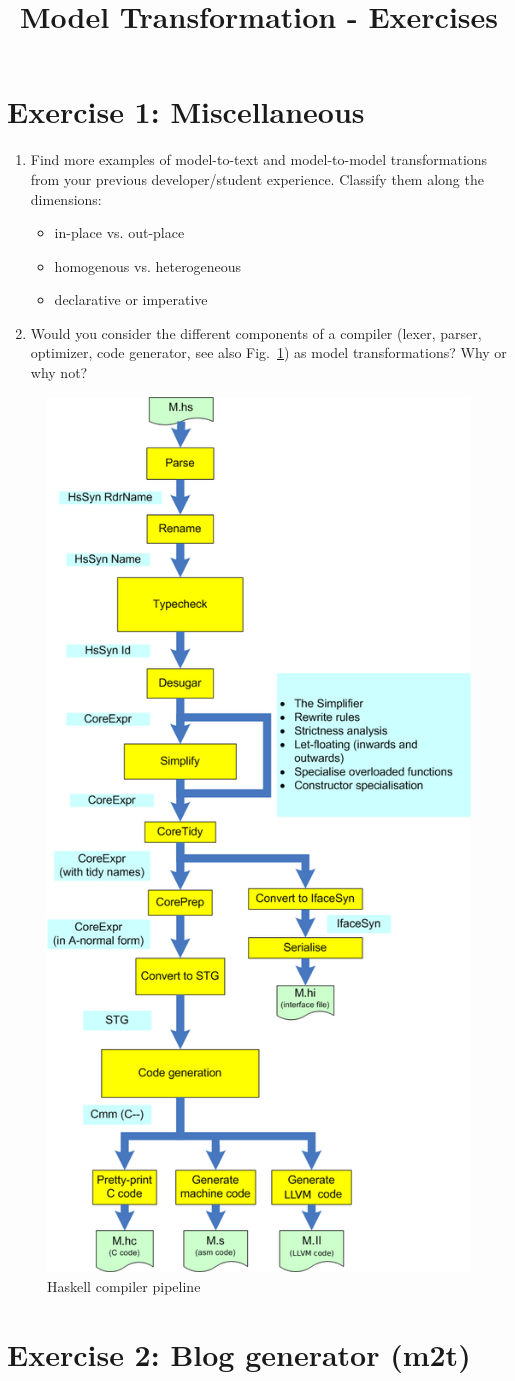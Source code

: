 \documentclass{article}
\title{Model Transformation - Exercises}
\author{}
\date{}
\begin{document}
	
	\maketitle
	
	\section*{Exercise 1: Miscellaneous}
	
	\begin{enumerate}
		\item Find more examples of model-to-text and model-to-model transformations from your previous developer/student experience. 
		Classify them along the dimensions:
		\begin{itemize}
			\item in-place vs. out-place
			\item homogenous vs. heterogeneous
			\item declarative or imperative
		\end{itemize}
		\item Would you consider the different components of a compiler (lexer, parser, optimizer, code generator, see also Fig.~\ref{fig:compilerPipeline}) as model transformations? Why or why not? 
	\end{enumerate}
	
	\begin{figure}[hbt]
		\centering
		\includegraphics[width=0.32\linewidth]{figures/haskell-pipeline}
		\caption{Haskell compiler pipeline}
		\label{fig:compilerPipeline}
	\end{figure}
	
	\clearpage
	
	\section*{Exercise 2: Blog generator (m2t)}
	
\end{document}
